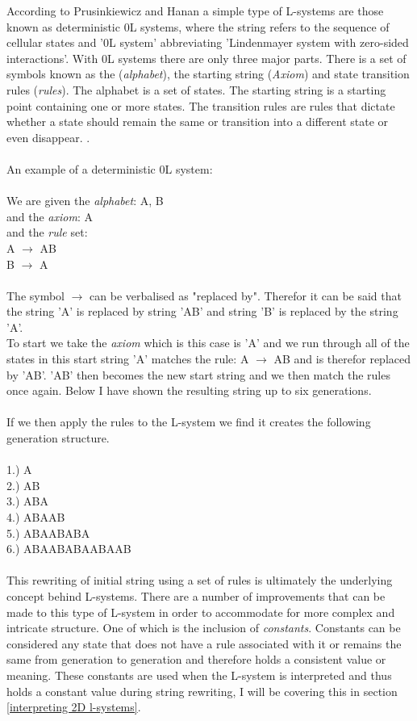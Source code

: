 According to Prusinkiewicz and Hanan a simple type of L-systems are those known as deterministic 0L systems, where the string refers to the sequence of cellular states and '0L system' abbreviating 'Lindenmayer system with zero-sided interactions'.  With 0L systems there are only three major parts. There is a set of symbols known as the (\textit{alphabet}), the starting string (\textit{Axiom}) and state transition rules (\textit{rules}). The alphabet is a set of states. The starting string is a starting point containing one or more states. The transition rules are rules that dictate whether a state should remain the same or transition into a different state or even disappear. \cite{prusinkiewicz2013lindenmayer}. \\
\\
An example of a deterministic 0L system: \\
\\
We are given the \textit{alphabet}: A, B \\ 
and the \textit{axiom}: A \\
and the \textit{rule} set: \\ 
A $\rightarrow$ AB \\
B $\rightarrow$ A \\
\\
The symbol $\rightarrow$ can be verbalised as "replaced by". Therefor it can be said that the string 'A' is replaced by string 'AB' and string 'B' is replaced by the string 'A'.\\
To start we take the \textit{axiom} which is this case is 'A' and we run through all of the states in this start string 'A' matches the rule: A $\rightarrow$ AB and is therefor replaced by 'AB'. 'AB' then becomes the new start string and we then match the rules once again. Below I have shown the resulting string up to six generations.\\
\\
If we then apply the rules to the L-system we find it creates the following generation structure. \\
\\
1.) A \\
2.) AB \\
3.) ABA \\
4.) ABAAB \\
5.) ABAABABA \\
6.) ABAABABAABAAB \\
\\
This rewriting of initial string using a set of rules is ultimately the underlying concept behind L-systems. There are a number of improvements that can be made to this type of L-system in order to accommodate for more complex and intricate structure. One of which is the inclusion of \textit{constants}. Constants can be considered any state that does not have a rule associated with it or remains the same from generation to generation and therefore holds a consistent value or meaning. These constants are used when the L-system is interpreted and thus holds a constant value during string rewriting, I will be covering this in section \ref{interpreting 2D l-systems}. \\
